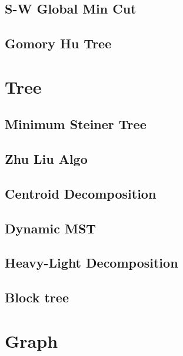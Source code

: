 \documentclass[a4paper,10pt,twocolumn,oneside]{article}
\begin{document}
\subsection{S-W Global Min Cut}


\subsection{Gomory Hu Tree}


\section{Tree}

\subsection{Minimum Steiner Tree}


\subsection{Zhu Liu Algo}


\subsection{Centroid Decomposition}


\subsection{Dynamic MST}


\subsection{Heavy-Light Decomposition}


\subsection{Block tree}


\section{Graph}
\end{document}
